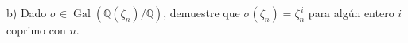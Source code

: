 b) Dado $\sigma\in\operatorname{Gal}(\mathbb{Q}(\zeta_{n})/\mathbb{Q})$, demuestre que $\sigma(\zeta_{n})=\zeta_{n}^{\,i}$ para algún entero $i$ coprimo con $n$.
